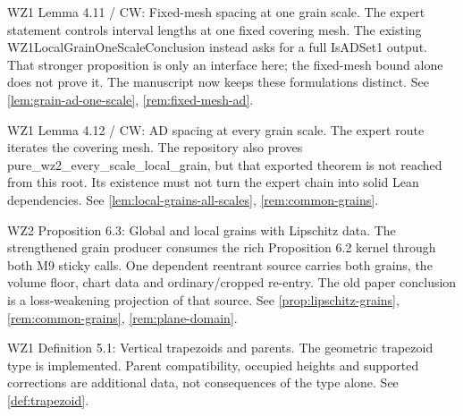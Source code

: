 \begin{remark}
\label{rem:atlas-L4_11}
WZ1 Lemma 4.11 / CW: Fixed-mesh spacing at one grain scale.
The expert statement controls interval lengths at one fixed covering mesh. The existing WZ1LocalGrainOneScaleConclusion instead asks for a full IsADSet1 output. That stronger proposition is only an interface here; the fixed-mesh bound alone does not prove it. The manuscript now keeps these formulations distinct.
See \ref{lem:grain-ad-one-scale}, \ref{rem:fixed-mesh-ad}.
\end{remark}

\begin{remark}
\label{rem:atlas-L4_12}
WZ1 Lemma 4.12 / CW: AD spacing at every grain scale.
The expert route iterates the covering mesh. The repository also proves pure\_wz2\_every\_scale\_local\_grain, but that exported theorem is not reached from this root. Its existence must not turn the expert chain into solid Lean dependencies.
See \ref{lem:local-grains-all-scales}, \ref{rem:common-grains}.
\end{remark}

\begin{remark}
\label{rem:atlas-W2P6_3}
WZ2 Proposition 6.3: Global and local grains with Lipschitz data.
The strengthened grain producer consumes the rich Proposition 6.2 kernel through both M9 sticky calls. One dependent reentrant source carries both grains, the volume floor, chart data and ordinary/cropped re-entry. The old paper conclusion is a loss-weakening projection of that source.
See \ref{prop:lipschitz-grains}, \ref{rem:common-grains}, \ref{rem:plane-domain}.
\end{remark}

\begin{remark}
\label{rem:atlas-Dtrap}
WZ1 Definition 5.1: Vertical trapezoids and parents.
The geometric trapezoid type is implemented. Parent compatibility, occupied heights and supported corrections are additional data, not consequences of the type alone.
See \ref{def:trapezoid}.
\end{remark}

